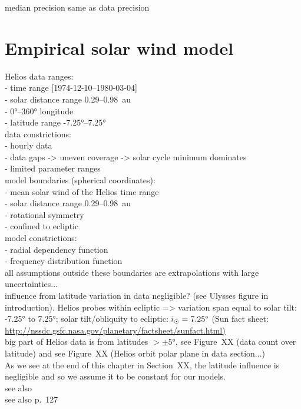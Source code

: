 median precision same as data precision\\


\section{Empirical solar wind model}

Helios data ranges:\\
- time range [1974-12-10--1980-03-04]\\
- solar distance range 0.29--0.98~au\\
- 0°--360° longitude\\
- latitude range -7.25°--7.25°\\
data constrictions:\\
- hourly data\\
- data gaps -> uneven coverage -> solar cycle minimum dominates\\
- limited parameter ranges\\

model boundaries (spherical coordinates):\\
- mean solar wind of the Helios time range\\
- solar distance range 0.29--0.98~au\\
- rotational symmetry\\
- confined to ecliptic\\
model constrictions:\\
- radial dependency function\\
- frequency distribution function\\

all assumptions outside these boundaries are extrapolations with large uncertainties...\\

influence from latitude variation in data negligible? (see Ulysses figure in introduction). Helios probes within ecliptic => variation span equal to solar tilt: -7.25° to 7.25°; solar tilt/obliquity to ecliptic: $i_\odot = 7.25\degree$ (Sun fact sheet: \url{http://nssdc.gsfc.nasa.gov/planetary/factsheet/sunfact.html)}\\
big part of Helios data is from latitudes $>\pm5$°, see Figure~XX (data count over latitude) and see Figure~XX (Helios orbit polar plane in data section...)\\
As we see at the end of this chapter in Section~XX, the latitude influence is negligible and so we assume it to be constant for our models.\\
see also \citet{Richardson1995}\\
see also \citet{Schwenn1990} p.~127\\

